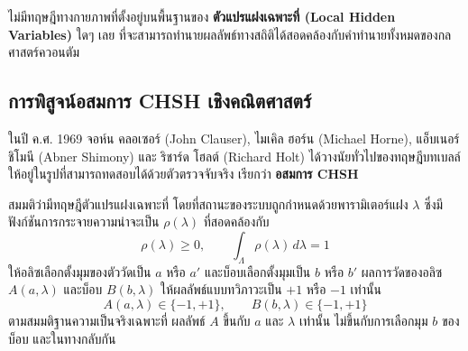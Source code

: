 \begin{tcolorbox}[colback=rbruLightBg, colframe=neonPurple, arc=2mm, title=\textbf{ทฤษฎีบทของเบลล์ (Bell's Theorem, 1964)}]
ไม่มีทฤษฎีทางกายภาพที่ตั้งอยู่บนพื้นฐานของ \textbf{ตัวแปรแฝงเฉพาะที่ (Local Hidden Variables)} ใดๆ เลย ที่จะสามารถทำนายผลลัพธ์ทางสถิติได้สอดคล้องกับคำทำนายทั้งหมดของกลศาสตร์ควอนตัม
\end{tcolorbox}

\subsection{การพิสูจน์อสมการ CHSH เชิงคณิตศาสตร์}
ในปี ค.ศ. 1969 จอห์น คลอเซอร์ (John Clauser), ไมเคิล ฮอร์น (Michael Horne), แอ็บเนอร์ ชิโมนี (Abner Shimony) และ ริชาร์ด โฮลต์ (Richard Holt) ได้วางนัยทั่วไปของทฤษฎีบทเบลล์ให้อยู่ในรูปที่สามารถทดสอบได้ด้วยตัวตรวจจับจริง เรียกว่า \textbf{อสมการ CHSH}

สมมติว่ามีทฤษฎีตัวแปรแฝงเฉพาะที่ โดยที่สถานะของระบบถูกกำหนดด้วยพารามิเตอร์แฝง $\lambda$ ซึ่งมีฟังก์ชันการกระจายความน่าจะเป็น $\rho(\lambda)$ ที่สอดคล้องกับ
\begin{equation}
\rho(\lambda) \ge 0, \qquad \int_\Lambda \rho(\lambda) \, d\lambda = 1
\end{equation}
ให้อลิซเลือกตั้งมุมของตัววัดเป็น $a$ หรือ $a'$ และบ็อบเลือกตั้งมุมเป็น $b$ หรือ $b'$ ผลการวัดของอลิซ $A(a, \lambda)$ และบ็อบ $B(b, \lambda)$ ให้ผลลัพธ์แบบทวิภาวะเป็น $+1$ หรือ $-1$ เท่านั้น
\begin{equation}
A(a, \lambda) \in \{-1, +1\}, \qquad B(b, \lambda) \in \{-1, +1\}
\end{equation}
ตามสมมติฐานความเป็นจริงเฉพาะที่ ผลลัพธ์ $A$ ขึ้นกับ $a$ และ $\lambda$ เท่านั้น ไม่ขึ้นกับการเลือกมุม $b$ ของบ็อบ และในทางกลับกัน

